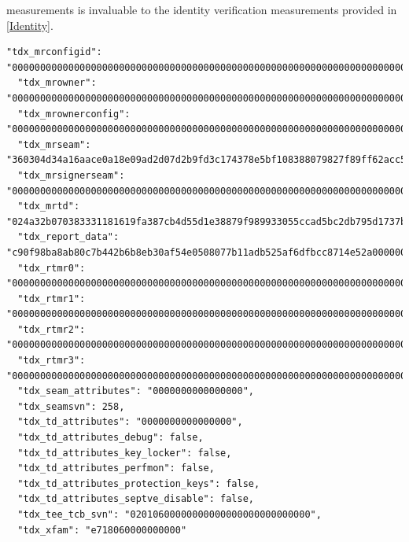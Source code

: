 measurements is invaluable to the identity verification measurements provided in \ref{Identity}. 

\begin{lstlisting}[language=jsonmain,caption={TDX generated part of an MAA quote},captionpos=b]
  "tdx_mrconfigid": "000000000000000000000000000000000000000000000000000000000000000000000000000000000000000000000000",
  "tdx_mrowner": "000000000000000000000000000000000000000000000000000000000000000000000000000000000000000000000000",
  "tdx_mrownerconfig": "000000000000000000000000000000000000000000000000000000000000000000000000000000000000000000000000",
  "tdx_mrseam": "360304d34a16aace0a18e09ad2d07d2b9fd3c174378e5bf108388079827f89ff62acc5f8c473dd40706324834e202946",
  "tdx_mrsignerseam": "000000000000000000000000000000000000000000000000000000000000000000000000000000000000000000000000",
  "tdx_mrtd": "024a32b070383331181619fa387cb4d55d1e38879f989933055ccad5bc2db795d1737b66205949d15469dc8c1ba7ab7b",
  "tdx_report_data": "c90f98ba8ab80c7b442b6b8eb30af54e0508077b11adb525af6dfbcc8714e52a0000000000000000000000000000000000000000000000000000000000000000",
  "tdx_rtmr0": "000000000000000000000000000000000000000000000000000000000000000000000000000000000000000000000000",
  "tdx_rtmr1": "000000000000000000000000000000000000000000000000000000000000000000000000000000000000000000000000",
  "tdx_rtmr2": "000000000000000000000000000000000000000000000000000000000000000000000000000000000000000000000000",
  "tdx_rtmr3": "000000000000000000000000000000000000000000000000000000000000000000000000000000000000000000000000",
  "tdx_seam_attributes": "0000000000000000",
  "tdx_seamsvn": 258,
  "tdx_td_attributes": "0000000000000000",
  "tdx_td_attributes_debug": false,
  "tdx_td_attributes_key_locker": false,
  "tdx_td_attributes_perfmon": false,
  "tdx_td_attributes_protection_keys": false,
  "tdx_td_attributes_septve_disable": false,
  "tdx_tee_tcb_svn": "02010600000000000000000000000000",
  "tdx_xfam": "e718060000000000"
\end{lstlisting}
\label{td_quote}


